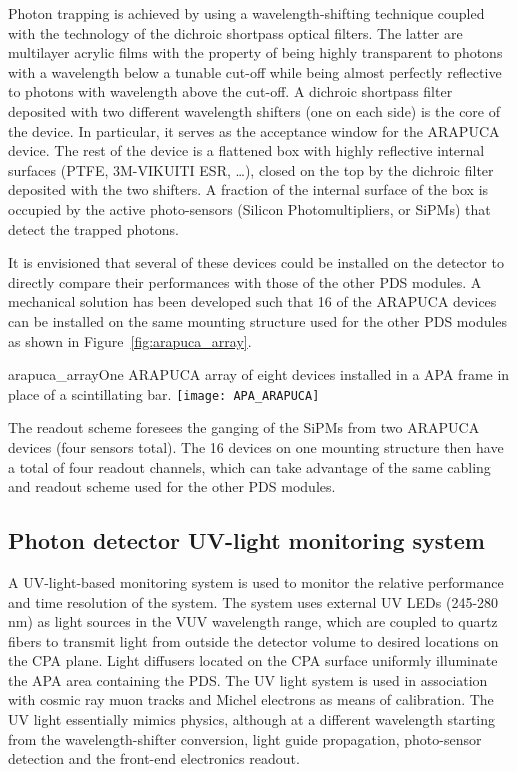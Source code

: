 Photon trapping is achieved by using a wavelength-shifting technique coupled with the technology of the dichroic shortpass optical filters. The latter are multilayer acrylic films 
with the  property of being highly transparent to photons with a wavelength below a tunable cut-off while being almost perfectly reflective to photons with wavelength above the cut-off. 
A dichroic shortpass filter deposited with two different wavelength shifters (one on each side) is the core of the device. In particular, it serves as the acceptance window for the 
ARAPUCA device. The rest of the device is a flattened box with highly reflective internal surfaces (PTFE, 3M-VIKUITI ESR, \dots), closed on the top by the 
dichroic  filter deposited with the two shifters. A fraction of the internal surface of the box is occupied by the active photo-sensors (Silicon Photomultipliers, or SiPMs) that detect the trapped photons.

It is envisioned that several of these devices could be installed on the detector to directly compare their performances with those of the
other PDS modules. A mechanical solution has been developed such that 16 of the ARAPUCA devices can be installed on the same mounting structure used for the other PDS modules as shown in Figure~\ref{fig:arapuca_array}.
\begin{cdrfigure}
  {arapuca_array}{One ARAPUCA array of eight devices installed in a APA frame in place of a scintillating bar.}
\texttt{[image: APA\_ARAPUCA]}
\end{cdrfigure}

The readout scheme foresees the ganging of the SiPMs from two ARAPUCA devices (four sensors total). The 16 devices on one mounting structure then have a total of four readout channels, which can take advantage of the same cabling and readout scheme used for the other PDS modules.

\subsection{Photon detector UV-light monitoring system}
\label{sec_pd_calib}

A UV-light-based monitoring system is used to monitor the relative performance and time resolution of the system.
The system uses external UV LEDs (245-280\,nm) as light sources in the VUV wavelength range, which are coupled to quartz fibers to transmit light from outside the detector volume to desired locations on the CPA plane.
Light diffusers located on the CPA surface uniformly illuminate the APA area 
containing the  PDS.
The UV light system is used in association with cosmic ray muon 
tracks and Michel electrons as means of calibration.
The UV light essentially mimics physics, although at a different wavelength starting from the wavelength-shifter conversion, 
light guide propagation, photo-sensor detection and the front-end electronics readout.
	
